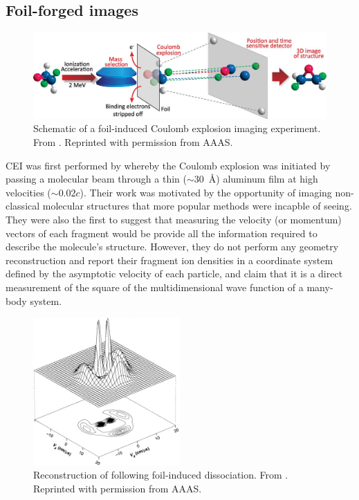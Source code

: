 \subsection{Foil-forged images}


\begin{figure}
  \centering
  \includegraphics[width=\textwidth]{gfx/FoilExperiment}
  \caption[Schematic of a foil-induced Coulomb explosion imaging experiment.]
  {Schematic of a foil-induced Coulomb explosion imaging experiment. From \citet{Herwig13}. Reprinted with permission from AAAS.}
\end{figure}

CEI was first performed by \citet{Vager89} whereby the Coulomb explosion was initiated by passing a molecular beam through a thin ($\sim$\SI{30}{\angstrom}) aluminum film at high velocities ($\sim0.02c$). Their work was motivated by the opportunity of imaging non-classical molecular structures that more popular methods were incapble of seeing. They were also the first to suggest that measuring the velocity (or momentum) vectors of each fragment would be provide all the information required to describe the molecule's structure. However, they do not perform any geometry reconstruction and report their fragment ion densities in a coordinate system defined by the asymptotic velocity of each particle, and claim that it is a direct measurement of the square of the multidimensional wave function of a many-body system.

\begin{figure}
  \centering
  \includegraphics[width=0.5\textwidth]{gfx/VagerPseudoGeometry}
  \caption[Reconstruction of  following foil-induced dissociation.]
  {Reconstruction of  following foil-induced dissociation. From \citet{Vager89}. Reprinted with permission from AAAS.}
\end{figure}

